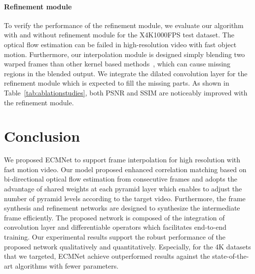 \documentclass[10pt,twocolumn,letterpaper]{article}
\begin{document}
\paragraph{Refinement module}
To verify the performance of the refinement module, we evaluate our algorithm with and without refinement module for the X4K1000FPS test dataset. 
The optical flow estimation can be failed in high-resolution video with fast object motion.
Furthermore, our interpolation module is designed simply blending two warped frames than other kernel based methods~\cite{bao2019depth, bao2019memc, lee2020adacof, niklaus2017video}, which can cause missing regions in the blended output.
We integrate the dilated convolution layer for the refinement module which is expected to fill the missing parts.
As shown in Table~\ref{tab:ablationstudies}, both PSNR and SSIM are noticeably improved with the refinement module.

\section{Conclusion}
We proposed {ECMNet} to support frame interpolation for high resolution with fast motion video. 
Our model proposed enhanced correlation matching based on bi-directional optical flow estimation from consecutive frames and adopts the advantage of shared weights at each pyramid layer which enables to adjust the number of pyramid levels according to the target video. 
Furthermore, the frame synthesis and refinement networks are designed to synthesize the intermediate frame efficiently.
The proposed network is composed of the integration of convolution layer and differentiable operators which facilitates end-to-end training. 
Our experimental results support the robust performance of the proposed network qualitatively and quantitatively. 
Especially, for the 4K datasets that we targeted, 
{ECMNet} achieve outperformed results against the state-of-the-art algorithms with fewer parameters.  
\end{document}
